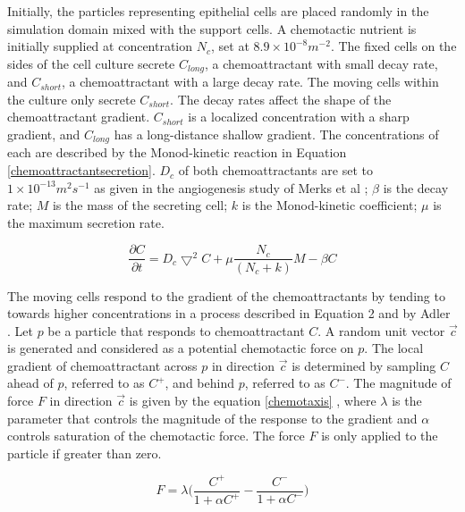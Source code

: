 Initially, the particles representing epithelial cells are placed randomly in the
simulation domain mixed with the support cells. A chemotactic nutrient is initially
supplied at concentration $N_{c}$, set at $8.9 \times 10^{-8} m^{-2}$. The fixed
cells on the sides of the cell culture secrete $C_{long}$, a chemoattractant with
small decay rate, and $C_{short}$, a chemoattractant with a large decay rate. The
moving cells within the culture only secrete $C_{short}$. The decay rates affect the
shape of the chemoattractant gradient. $C_{short}$ is a localized concentration with
a sharp gradient, and $C_{long}$ has a long-distance shallow gradient. The
concentrations of each are described by the Monod-kinetic reaction in Equation
\ref{chemoattractantsecretion}.  $D_{c}$ of both chemoattractants are set to $1
\times 10^{-13} m^{2} s^{-1}$ as given in the  angiogenesis study of
Merks et al \cite{delindavis:Merks2008ContactInhibited}; $\beta$ is the decay rate;
$M$ is the mass of the secreting cell; $k$ is the Monod-kinetic coefficient; $\mu$ is
the maximum secretion rate.

\begin{equation}
    \frac{\partial C}{\partial t}=D_{c}\bigtriangledown^{2} C + \mu \frac{N_c}{(N_c
    +k)} M - \beta C
    \label{chemoattractantsecretion}
\end{equation}

The moving cells respond to the gradient of the chemoattractants by tending to
towards higher concentrations in a process described in Equation 2 and by Adler
\cite{delindavis:chemotaxisbasepaper}. Let $p$ be a particle that responds to
chemoattractant $C$. A random unit vector $\vec{c}$ is generated and considered as a
potential chemotactic force on $p$. The local gradient of chemoattractant across $p$
in direction $\vec{c}$ is determined by sampling $C$ ahead of $p$, referred to as
$C^{+}$, and behind $p$, referred to as $C^{-}$. The magnitude of force $F$ in
direction $\vec{c}$ is given by the equation \ref{chemotaxis}
\cite{delindavis:Merks2008ContactInhibited}, where $\lambda$ is the parameter that
controls the magnitude of the response to the gradient and $\alpha$ controls
saturation of the chemotactic force. The force $F$ is only applied to the particle if
greater than zero.

\begin{equation}
    F = \lambda \Big(\frac{C^{+}}{1 + \alpha C^{+}} - \frac{C^{-}}{1 + \alpha
    C^{-}}\Big)
    \label{chemotaxis}
\end{equation}




